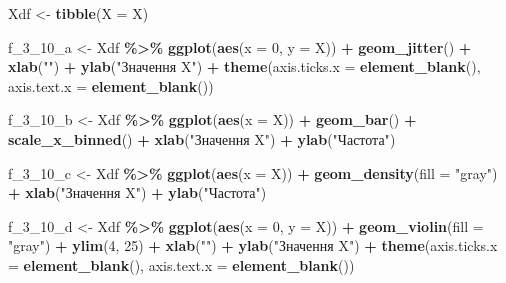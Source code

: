 \documentclass[
  11pt,
]{book}
\newenvironment{Shaded}{\begin{snugshade}}{\end{snugshade}}
\newcommand{\AttributeTok}[1]{\textcolor[rgb]{0.13,0.29,0.53}{#1}}
\newcommand{\DecValTok}[1]{\textcolor[rgb]{0.00,0.00,0.81}{#1}}
\newcommand{\FunctionTok}[1]{\textcolor[rgb]{0.13,0.29,0.53}{\textbf{#1}}}
\newcommand{\NormalTok}[1]{#1}
\newcommand{\OtherTok}[1]{\textcolor[rgb]{0.56,0.35,0.01}{#1}}
\newcommand{\SpecialCharTok}[1]{\textcolor[rgb]{0.81,0.36,0.00}{\textbf{#1}}}
\newcommand{\StringTok}[1]{\textcolor[rgb]{0.31,0.60,0.02}{#1}}
\begin{document}
\begin{Shaded}
\begin{Highlighting}[]
\NormalTok{Xdf }\OtherTok{\textless{}{-}} \FunctionTok{tibble}\NormalTok{(}\AttributeTok{X =}\NormalTok{ X)}

\NormalTok{f\_3\_10\_a }\OtherTok{\textless{}{-}}\NormalTok{ Xdf }\SpecialCharTok{\%\textgreater{}\%} 
  \FunctionTok{ggplot}\NormalTok{(}\FunctionTok{aes}\NormalTok{(}\AttributeTok{x =} \DecValTok{0}\NormalTok{, }\AttributeTok{y =}\NormalTok{ X)) }\SpecialCharTok{+}
  \FunctionTok{geom\_jitter}\NormalTok{() }\SpecialCharTok{+}
  \FunctionTok{xlab}\NormalTok{(}\StringTok{""}\NormalTok{) }\SpecialCharTok{+} \FunctionTok{ylab}\NormalTok{(}\StringTok{"Значення X"}\NormalTok{) }\SpecialCharTok{+}
  \FunctionTok{theme}\NormalTok{(}\AttributeTok{axis.ticks.x =} \FunctionTok{element\_blank}\NormalTok{(),}
        \AttributeTok{axis.text.x =} \FunctionTok{element\_blank}\NormalTok{())}

\NormalTok{f\_3\_10\_b }\OtherTok{\textless{}{-}}\NormalTok{ Xdf }\SpecialCharTok{\%\textgreater{}\%} 
  \FunctionTok{ggplot}\NormalTok{(}\FunctionTok{aes}\NormalTok{(}\AttributeTok{x =}\NormalTok{ X)) }\SpecialCharTok{+}
  \FunctionTok{geom\_bar}\NormalTok{() }\SpecialCharTok{+}
  \FunctionTok{scale\_x\_binned}\NormalTok{() }\SpecialCharTok{+}
  \FunctionTok{xlab}\NormalTok{(}\StringTok{"Значення X"}\NormalTok{) }\SpecialCharTok{+} \FunctionTok{ylab}\NormalTok{(}\StringTok{"Частота"}\NormalTok{)}

\NormalTok{f\_3\_10\_c }\OtherTok{\textless{}{-}}\NormalTok{ Xdf }\SpecialCharTok{\%\textgreater{}\%} 
  \FunctionTok{ggplot}\NormalTok{(}\FunctionTok{aes}\NormalTok{(}\AttributeTok{x =}\NormalTok{ X)) }\SpecialCharTok{+}
  \FunctionTok{geom\_density}\NormalTok{(}\AttributeTok{fill =} \StringTok{"gray"}\NormalTok{) }\SpecialCharTok{+}
  \FunctionTok{xlab}\NormalTok{(}\StringTok{"Значення X"}\NormalTok{) }\SpecialCharTok{+} \FunctionTok{ylab}\NormalTok{(}\StringTok{"Частота"}\NormalTok{)}

\NormalTok{f\_3\_10\_d }\OtherTok{\textless{}{-}}\NormalTok{ Xdf }\SpecialCharTok{\%\textgreater{}\%} 
  \FunctionTok{ggplot}\NormalTok{(}\FunctionTok{aes}\NormalTok{(}\AttributeTok{x =} \DecValTok{0}\NormalTok{, }\AttributeTok{y =}\NormalTok{ X)) }\SpecialCharTok{+}
  \FunctionTok{geom\_violin}\NormalTok{(}\AttributeTok{fill =} \StringTok{"gray"}\NormalTok{) }\SpecialCharTok{+}
  \FunctionTok{ylim}\NormalTok{(}\DecValTok{4}\NormalTok{, }\DecValTok{25}\NormalTok{) }\SpecialCharTok{+}
  \FunctionTok{xlab}\NormalTok{(}\StringTok{""}\NormalTok{) }\SpecialCharTok{+} \FunctionTok{ylab}\NormalTok{(}\StringTok{"Значення X"}\NormalTok{) }\SpecialCharTok{+}
  \FunctionTok{theme}\NormalTok{(}\AttributeTok{axis.ticks.x =} \FunctionTok{element\_blank}\NormalTok{(),}
        \AttributeTok{axis.text.x =} \FunctionTok{element\_blank}\NormalTok{())}


\end{Highlighting}
\end{Shaded}
\end{document}
